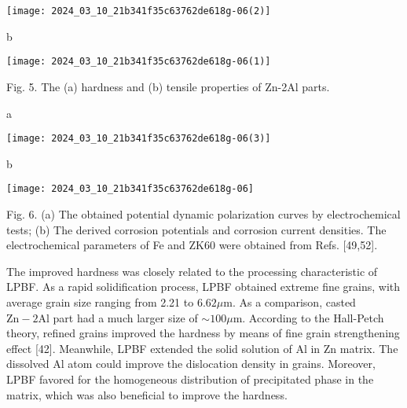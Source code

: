 \documentclass[10pt]{article}
\begin{document}
\begin{center}
\texttt{[image: 2024\_03\_10\_21b341f35c63762de618g-06(2)]}
\end{center}

b

\begin{center}
\texttt{[image: 2024\_03\_10\_21b341f35c63762de618g-06(1)]}
\end{center}

Fig. 5. The (a) hardness and (b) tensile properties of Zn-2Al parts.

a

\begin{center}
\texttt{[image: 2024\_03\_10\_21b341f35c63762de618g-06(3)]}
\end{center}

b

\begin{center}
\texttt{[image: 2024\_03\_10\_21b341f35c63762de618g-06]}
\end{center}

Fig. 6. (a) The obtained potential dynamic polarization curves by electrochemical tests; (b) The derived corrosion potentials and corrosion current densities. The electrochemical parameters of Fe and ZK60 were obtained from Refs. [49,52].

The improved hardness was closely related to the processing characteristic of LPBF. As a rapid solidification process, LPBF obtained extreme fine grains, with average grain size ranging from 2.21 to $6.62 \mu \mathrm{m}$. As a comparison, casted $\mathrm{Zn}-2 \mathrm{Al}$ part had a much larger size of $\sim 100 \mu \mathrm{m}$. According to the Hall-Petch theory, refined grains improved the hardness by means of fine grain strengthening effect [42]. Meanwhile, LPBF extended the solid solution of Al in Zn matrix. The dissolved $\mathrm{Al}$ atom could improve the dislocation density in grains. Moreover, LPBF favored for the homogeneous distribution of precipitated phase in the matrix, which was also beneficial to improve the hardness.
\end{document}

